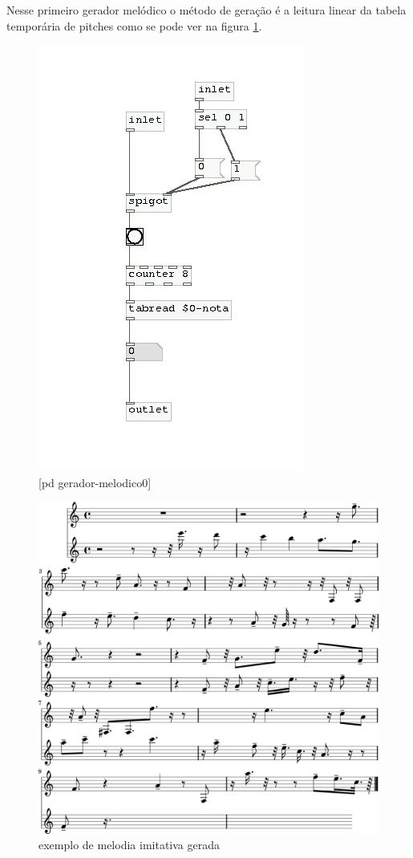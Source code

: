 \documentclass[draft]{ppgmus}
\begin{document}
Nesse primeiro gerador melódico o método de geração
é a leitura linear da tabela temporária de pitches
como se pode ver na figura \ref{gera-melodico0}.


\begin{figure}
\includegraphics[scale=.6]{gera-melodico0}
\caption{[pd gerador-melodico0]}
\label{gera-melodico0}
\end{figure}  

\begin{figure}
\includegraphics[scale=.55]{gera-mel0}
\caption{exemplo de melodia imitativa gerada}
\label{gera-mel0}
\end{figure}  
\end{document}
